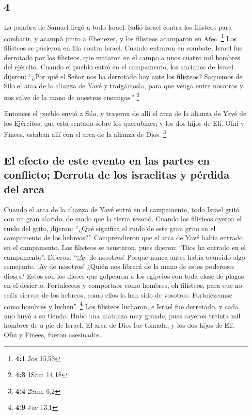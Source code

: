 \begin{paracol}{2}
\hypertarget{section-6}{%
\section{4}\label{section-6}}

 La palabra de Samuel llegó a todo Israel. Salió Israel
contra los filisteos para combatir, y acampó junto a Ebenezer, y los
filisteos acamparon en Afec. \footnote{\textbf{4:1} Jos 15,53}
 Los filisteos se pusieron en fila contra Israel. Cuando
entraron en combate, Israel fue derrotado por los filisteos, que mataron
en el campo a unos cuatro mil hombres del ejército. 
Cuando el pueblo entró en el campamento, los ancianos de Israel dijeron:
``¿Por qué el Señor nos ha derrotado hoy ante los filisteos? Saquemos de
Silo el arca de la alianza de Yavé y traigámosla, para que venga entre
nosotros y nos salve de la mano de nuestros enemigos.'' \footnote{\textbf{4:3}
  1Sam 14,18}

 Entonces el pueblo envió a Silo, y trajeron de allí el
arca de la alianza de Yavé de los Ejércitos, que está sentada sobre los
querubines; y los dos hijos de Elí, Ofni y Finees, estaban allí con el
arca de la alianza de Dios. \footnote{\textbf{4:4} 2Sam 6,2}

\hypertarget{el-efecto-de-este-evento-en-las-partes-en-conflicto-derrota-de-los-israelitas-y-puxe9rdida-del-arca}{%
\subsection{El efecto de este evento en las partes en conflicto; Derrota
de los israelitas y pérdida del
arca}\label{el-efecto-de-este-evento-en-las-partes-en-conflicto-derrota-de-los-israelitas-y-puxe9rdida-del-arca}}

 Cuando el arca de la alianza de Yavé entró en el
campamento, todo Israel gritó con un gran alarido, de modo que la tierra
resonó.  Cuando los filisteos oyeron el ruido del grito,
dijeron: ``¿Qué significa el ruido de este gran grito en el campamento
de los hebreos?'' Comprendieron que el arca de Yavé había entrado en el
campamento.  Los filisteos se asustaron, pues dijeron:
``Dios ha entrado en el campamento''. Dijeron: ``¡Ay de nosotros! Porque
nunca antes había ocurrido algo semejante.  ¡Ay de
nosotros! ¿Quién nos librará de la mano de estos poderosos dioses? Estos
son los dioses que golpearon a los egipcios con toda clase de plagas en
el desierto.  Fortaleceos y comportaos como hombres, oh
filisteos, para que no seáis siervos de los hebreos, como ellos lo han
sido de vosotros. Fortalézcanse como hombres y luchen''. \footnote{\textbf{4:9}
  Jue 13,1}  Los filisteos lucharon, e Israel fue
derrotado, y cada uno huyó a su tienda. Hubo una matanza muy grande,
pues cayeron treinta mil hombres de a pie de Israel.  El
arca de Dios fue tomada, y los dos hijos de Elí, Ofni y Finees, fueron
asesinados.


\end{paracol}
